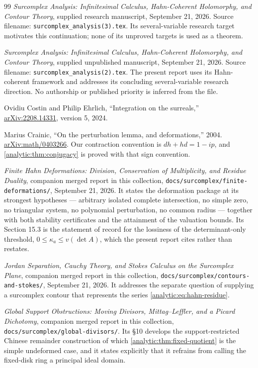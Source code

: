 \documentclass[11pt,letterpaper]{article}
\theoremstyle{definition}
\theoremstyle{remark}
\numberwithin{equation}{section}
\begin{document}
\begin{thebibliography}{99}
\emph{Surcomplex Analysis: Infinitesimal Calculus, Hahn-Coherent Holomorphy,
and Contour Theory},
supplied research manuscript, September 21, 2026.
Source filename: \texttt{surcomplex\_analysis(3).tex}.
Its several-variable research target motivates this continuation; none of
its unproved targets is used as a theorem.

\emph{Surcomplex Analysis: Infinitesimal Calculus, Hahn-Coherent Holomorphy,
and Contour Theory},
supplied unpublished manuscript, September 21, 2026.
Source filename: \texttt{surcomplex\_analysis(2).tex}.
The present report uses its Hahn-coherent framework and addresses its
concluding several-variable research direction. No authorship or published
priority is inferred from the file.

Ovidiu Costin and Philip Ehrlich,
``Integration on the surreals,''
\href{https://arxiv.org/abs/2208.14331}{arXiv:2208.14331}, version 5, 2024.

Marius Crainic,
``On the perturbation lemma, and deformations,'' 2004.
\href{https://arxiv.org/abs/math/0403266}{arXiv:math/0403266}.
Our contraction convention is $dh+hd=1-ip$, and
\cref{analytic:thm:conjugacy} is proved with that sign convention.

\emph{Finite Hahn Deformations: Division, Conservation of Multiplicity,
and Residue Duality}, companion merged report in this collection,
\texttt{docs/surcomplex/finite-deformations/}, September 21, 2026.
It states the deformation package at its strongest hypotheses --- arbitrary
isolated complete intersection, no simple zero, no triangular system, no
polynomial perturbation, no common radius --- together with both stability
certificates and the attainment of the valuation bounds.
Its Section 15.3 is the statement of record for the lossiness of the
determinant-only threshold, $0\leq\kappa_a\leq v(\det A)$, which the present
report cites rather than restates.

\emph{Jordan Separation, Cauchy Theory, and Stokes Calculus on the
Surcomplex Plane}, companion merged report in this collection,
\texttt{docs/surcomplex/contours-and-stokes/}, September 21, 2026.
It addresses the separate question of supplying a surcomplex contour that
represents the series \eqref{analytic:eq:hahn-residue}.

\emph{Global Support Obstructions: Moving Divisors, Mittag--Leffler, and a
Picard Dichotomy}, companion merged report in this collection,
\texttt{docs/surcomplex/global-divisors/}.
Its \S10 develops the support-restricted Chinese remainder construction of
which \cref{analytic:thm:fixed-quotient} is the simple undeformed case, and
it states explicitly that it refrains from calling the fixed-disk ring a
principal ideal domain.


\end{thebibliography}
\end{document}
